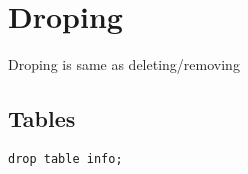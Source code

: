\documentclass[11pt]{article}
\begin{document}
\section{Droping}
\label{sec:orgheadline18}
Droping is same as deleting/removing
\subsection{Tables}
\label{sec:orgheadline17}
\begin{verbatim}
drop table info;
\end{verbatim}
\end{document}
